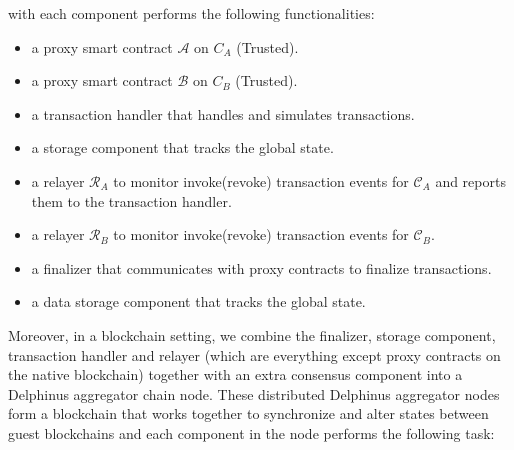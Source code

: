\documentclass[pageno]{jpaper}
\begin{document}
with each component performs the following functionalities:
\begin{itemize}
\item  a proxy smart contract $\mathcal{A}$ on $C_{A}$ (Trusted).
\item  a proxy smart contract $\mathcal{B}$ on $C_{B}$ (Trusted).
\item  a transaction handler that handles and simulates transactions.
\item  a storage component that tracks the global state.
\item  a relayer $\mathcal{R}_A$ to monitor invoke(revoke) transaction events for $\mathcal{C}_A$ and reports them to the transaction handler.
\item  a relayer $\mathcal{R}_B$ to monitor invoke(revoke) transaction events for $\mathcal{C}_B$.
\item  a finalizer that communicates with proxy contracts to finalize transactions.
\item  a data storage component that tracks the global state.
\end{itemize}
Moreover, in a blockchain setting, we combine the finalizer, storage component, transaction handler and relayer (which are everything except proxy contracts on the native blockchain) together with an extra consensus component into a Delphinus aggregator chain node. These distributed Delphinus aggregator nodes form a blockchain that works together to synchronize and alter states between guest blockchains and each component in the node performs the following task:
\end{document}
